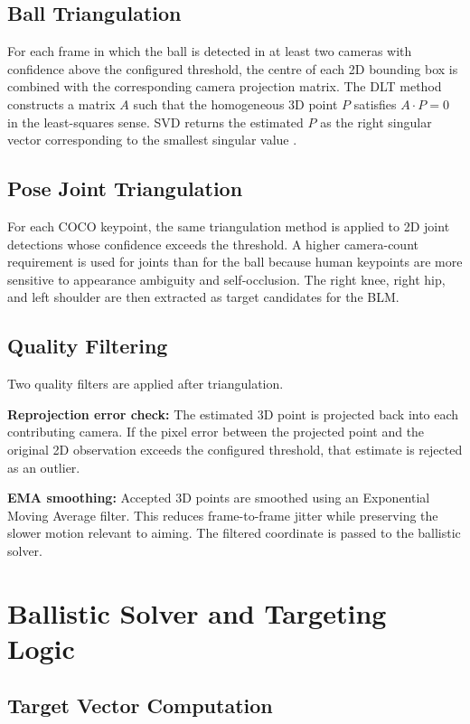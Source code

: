 \subsection{Ball Triangulation}

For each frame in which the ball is detected in at least two cameras with confidence above the configured threshold, the centre of each 2D bounding box is combined with the corresponding camera projection matrix. The DLT method constructs a matrix $A$ such that the homogeneous 3D point $P$ satisfies $A \cdot P = 0$ in the least-squares sense. SVD returns the estimated $P$ as the right singular vector corresponding to the smallest singular value \cite{ref1}.

\subsection{Pose Joint Triangulation}

For each COCO keypoint, the same triangulation method is applied to 2D joint detections whose confidence exceeds the threshold. A higher camera-count requirement is used for joints than for the ball because human keypoints are more sensitive to appearance ambiguity and self-occlusion. The right knee, right hip, and left shoulder are then extracted as target candidates for the BLM.

\subsection{Quality Filtering}

Two quality filters are applied after triangulation.

\textbf{Reprojection error check:} The estimated 3D point is projected back into each contributing camera. If the pixel error between the projected point and the original 2D observation exceeds the configured threshold, that estimate is rejected as an outlier.

\textbf{EMA smoothing:} Accepted 3D points are smoothed using an Exponential Moving Average filter. This reduces frame-to-frame jitter while preserving the slower motion relevant to aiming. The filtered coordinate is passed to the ballistic solver.

\section{Ballistic Solver and Targeting Logic}

\subsection{Target Vector Computation}

